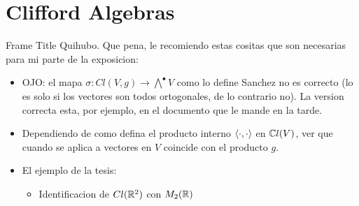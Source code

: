 \section{Clifford Algebras}



\begin{frame}{Frame Title} %
    \tiny
    Quihubo. Que pena, le recomiendo estas cositas que son necesarias para mi parte de la exposicion:
    
        \begin{itemize}
        
        \item OJO: el mapa $\sigma : Cl(V, g) \to \bigwedge ^\bullet V$ como lo define Sanchez no es correcto (lo es solo si los vectores son todos ortogonales, de lo contrario no). La version correcta esta, por ejemplo, en el documento que le mande en la tarde.
        
        \item Dependiendo de como defina el producto interno $\langle \cdot, \cdot \rangle$ en $\mathbb C l(V)$, ver que cuando se aplica a vectores en $V$ coincide con el producto $g$.
        
        \item El ejemplo de la tesis: 
        
            \begin{itemize}
                
            \item \tiny Identificacion de $Cl(\mathbb R^2)$ con $M_2(\mathbb R)$
            \end{itemize}
            
        \end{itemize}
    
    \normalsize
\end{frame}


